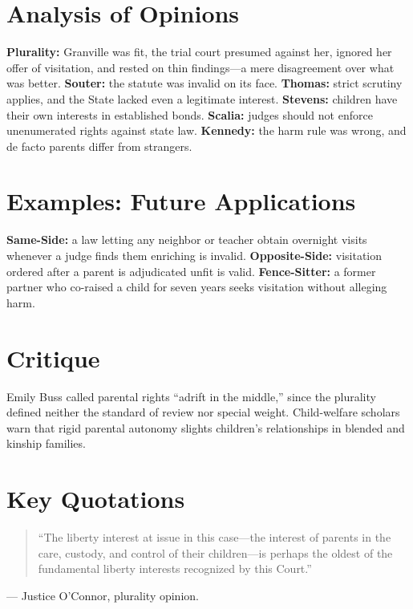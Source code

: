\documentclass[12pt]{article}
\begin{document}
\section{Analysis of Opinions}
\textbf{Plurality:} Granville was fit, the trial court presumed against her, ignored her offer of visitation, and rested on thin findings---a mere disagreement over what was better. \textbf{Souter:} the statute was invalid on its face. \textbf{Thomas:} strict scrutiny applies, and the State lacked even a legitimate interest. \textbf{Stevens:} children have their own interests in established bonds. \textbf{Scalia:} judges should not enforce unenumerated rights against state law. \textbf{Kennedy:} the harm rule was wrong, and de facto parents differ from strangers.

\section{Examples: Future Applications}
\textbf{Same-Side:} a law letting any neighbor or teacher obtain overnight visits whenever a judge finds them enriching is invalid. \textbf{Opposite-Side:} visitation ordered after a parent is adjudicated unfit is valid. \textbf{Fence-Sitter:} a former partner who co-raised a child for seven years seeks visitation without alleging harm.

\section{Critique}
Emily Buss called parental rights ``adrift in the middle,'' since the plurality defined neither the standard of review nor special weight. Child-welfare scholars warn that rigid parental autonomy slights children's relationships in blended and kinship families.

\section{Key Quotations}
\begin{quote}
``The liberty interest at issue in this case---the interest of parents in the care, custody, and control of their children---is perhaps the oldest of the fundamental liberty interests recognized by this Court.''
\end{quote}
\noindent --- Justice O'Connor, plurality opinion.
\end{document}
